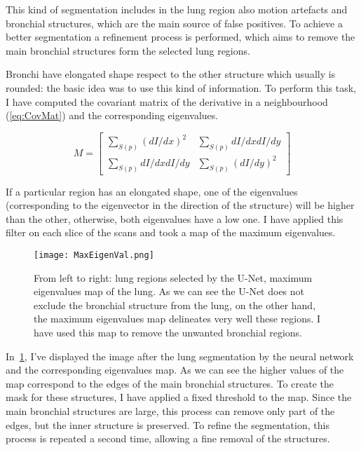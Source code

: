 \documentclass{standalone}
\begin{document}
 

	This kind of segmentation includes in the lung region also motion artefacts and bronchial structures, which are the main source of false positives. To achieve a better segmentation a refinement process is performed, which aims to remove the main bronchial structures form the selected lung regions. 

	Bronchi have elongated shape respect to the other structure which usually is rounded: the basic idea was to use this kind of information. To perform this task, I have computed the covariant matrix of the derivative in a neighbourhood (\ref{eq:CovMat}) and the corresponding eigenvalues.
	 
	\begin{equation}\label{eq:CovMat}
		M = \begin{bmatrix} \sum _{S(p)}(dI/dx)^2 & \sum _{S(p)}dI/dx dI/dy \\ \sum _{S(p)}dI/dx dI/dy & \sum _{S(p)}(dI/dy)^2 \end{bmatrix}
	\end{equation}
	 
 	If a particular region has an elongated shape, one of the eigenvalues (corresponding to the eigenvector in the direction of the structure) will be higher than the other, otherwise, both eigenvalues have a low one. I have applied this filter on each slice of the scans and took a map of the maximum eigenvalues. 
	\begin{figure}[h!]
		\centering
			\texttt{[image: MaxEigenVal.png]}
		\caption{From left to right: lung regions selected by the U-Net, maximum eigenvalues map of the lung. As we can see the U-Net does not exclude the bronchial structure from the lung, on the other hand, the maximum eigenvalues map delineates very well these regions. I have used this map to remove the unwanted bronchial regions.}\label{fig:MaxEigenval}
	\end{figure}


	In \figurename\,\ref{fig:MaxEigenval}, I've displayed the image after the lung segmentation by the neural network and the corresponding eigenvalues map. As we can see the higher values of the map correspond to the edges of the main bronchial structures. To create the mask for these structures, I have applied a fixed threshold to the map. Since the main bronchial structures are large, this process can remove only part of the edges, but the inner structure is preserved. To refine the segmentation, this process is repeated a second time, allowing a fine removal of the structures.
	
\end{document}
